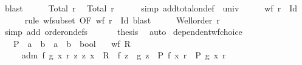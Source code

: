 \begin{isabellebody}
\ blast\isanewline
\ \ \isamarkupfalse%
\ \isamarkupfalse%
\ {\isacartoucheopen}Total\ r{\isacartoucheclose}\ \isamarkupfalse%
\ {\isachardoublequoteopen}Total\ {\isacharquery}{\kern0pt}r{\isachardoublequoteclose}\isanewline
\ \ \ \ \isamarkupfalse%
\ {\isacharparenleft}{\kern0pt}simp\ add{\isacharcolon}{\kern0pt}total{\isacharunderscore}{\kern0pt}on{\isacharunderscore}{\kern0pt}def\ {}\ univ{\isacharparenright}{\kern0pt}\isanewline
\ \ \isamarkupfalse%
\ \isamarkupfalse%
\ {\isachardoublequoteopen}wf\ {\isacharparenleft}{\kern0pt}{\isacharquery}{\kern0pt}r\ {\isacharminus}{\kern0pt}\ Id{\isacharparenright}{\kern0pt}{\isachardoublequoteclose}\isanewline
\ \ \ \ \isamarkupfalse%
\ {\isacharparenleft}{\kern0pt}rule\ wf{\isacharunderscore}{\kern0pt}subset\ {\isacharbrackleft}{\kern0pt}OF\ {\isacartoucheopen}wf\ {\isacharparenleft}{\kern0pt}r\ {\isacharminus}{\kern0pt}\ Id{\isacharparenright}{\kern0pt}{\isacartoucheclose}{\isacharbrackright}{\kern0pt}{\isacharparenright}{\kern0pt}\ blast\isanewline
\ \ \isamarkupfalse%
\ \isamarkupfalse%
\ {\isachardoublequoteopen}Well{\isacharunderscore}{\kern0pt}order\ {\isacharquery}{\kern0pt}r{\isachardoublequoteclose}\isanewline
\ \ \ \ \isamarkupfalse%
\ {\isacharparenleft}{\kern0pt}simp\ add{\isacharcolon}{\kern0pt}\ order{\isacharunderscore}{\kern0pt}on{\isacharunderscore}{\kern0pt}defs{\isacharparenright}{\kern0pt}\isanewline
\ \ \isamarkupfalse%
\ {}\ \isamarkupfalse%
\ {\isacharquery}{\kern0pt}thesis\ \isamarkupfalse%
\ auto\isanewline
{}\isamarkupfalse%
%
\endisatagproof
{\isafoldproof}%
%
\isadelimproof
\isanewline
%
\endisadelimproof
\isanewline
{}\isamarkupfalse%
\ dependent{\isacharunderscore}{\kern0pt}wf{\isacharunderscore}{\kern0pt}choice{\isacharcolon}{\kern0pt}\isanewline
\ \ \ P\ {\isacharcolon}{\kern0pt}{\isacharcolon}{\kern0pt}\ {\isachardoublequoteopen}{\isacharparenleft}{\kern0pt}{\isacharprime}{\kern0pt}a\ {\isasymRightarrow}\ {\isacharprime}{\kern0pt}b{\isacharparenright}{\kern0pt}\ {\isasymRightarrow}\ {\isacharprime}{\kern0pt}a\ {\isasymRightarrow}\ {\isacharprime}{\kern0pt}b\ {\isasymRightarrow}\ bool{\isachardoublequoteclose}\isanewline
\ \ \ {\isachardoublequoteopen}wf\ R{\isachardoublequoteclose}\isanewline
\ \ \ \ \ adm{\isacharcolon}{\kern0pt}\ {\isachardoublequoteopen}{\isasymAnd}f\ g\ x\ r{\isachardot}{\kern0pt}\ {\isacharparenleft}{\kern0pt}{\isasymAnd}z{\isachardot}{\kern0pt}\ {\isacharparenleft}{\kern0pt}z{\isacharcomma}{\kern0pt}\ x{\isacharparenright}{\kern0pt}\ {\isasymin}\ R\ {\isasymLongrightarrow}\ f\ z\ {\isacharequal}{\kern0pt}\ g\ z{\isacharparenright}{\kern0pt}\ {\isasymLongrightarrow}\ P\ f\ x\ r\ {\isacharequal}{\kern0pt}\ P\ g\ x\ r{\isachardoublequoteclose}\isanewline

\end{isabellebody}
